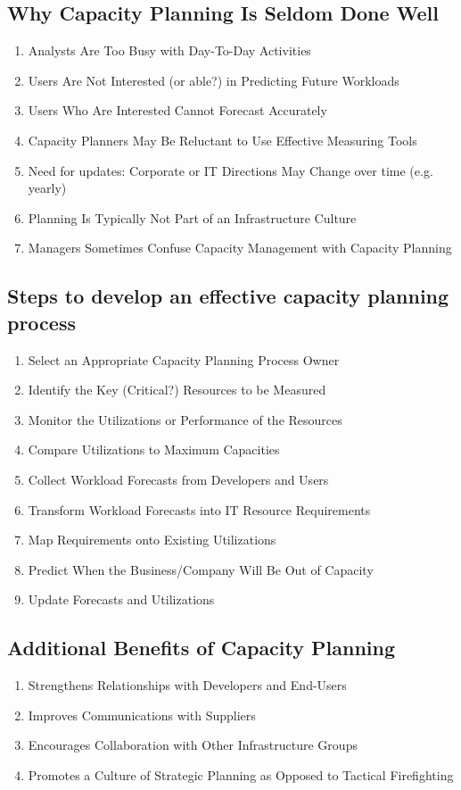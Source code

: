 \documentclass[a4]{article}
\begin{document}
\begin{multicols}{3}
\subsection{Why Capacity Planning Is Seldom Done Well}
\begin{enumerate}
    \item Analysts Are Too Busy with Day-To-Day Activities
    \item Users Are Not Interested (or able?) in Predicting Future Workloads
    \item Users Who Are Interested Cannot Forecast Accurately
    \item Capacity Planners May Be Reluctant to Use Effective Measuring
    Tools
    \item Need for updates: Corporate or IT Directions May Change over
    time (e.g. yearly)
    \item Planning Is Typically Not Part of an Infrastructure Culture
    \item Managers Sometimes Confuse Capacity Management with Capacity Planning
\end{enumerate}

\subsection{Steps to develop an effective capacity planning process}
\begin{enumerate}
    \item Select an Appropriate Capacity Planning Process Owner
    \item Identify the Key (Critical?) Resources to be Measured
    \item Monitor the Utilizations or Performance of the Resources
    \item Compare Utilizations to Maximum Capacities
    \item Collect Workload Forecasts from Developers and Users
    \item Transform Workload Forecasts into IT Resource Requirements
    \item Map Requirements onto Existing Utilizations
    \item Predict When the Business/Company Will Be Out of Capacity
    \item Update Forecasts and Utilizations
\end{enumerate}

\subsection{Additional Benefits of Capacity Planning}
\begin{enumerate}
    \item Strengthens Relationships with Developers and End-Users
    \item Improves Communications with Suppliers
    \item Encourages Collaboration with Other Infrastructure Groups
    \item Promotes a Culture of Strategic Planning as Opposed to Tactical Firefighting
\end{enumerate}


\end{multicols}
\end{document}
